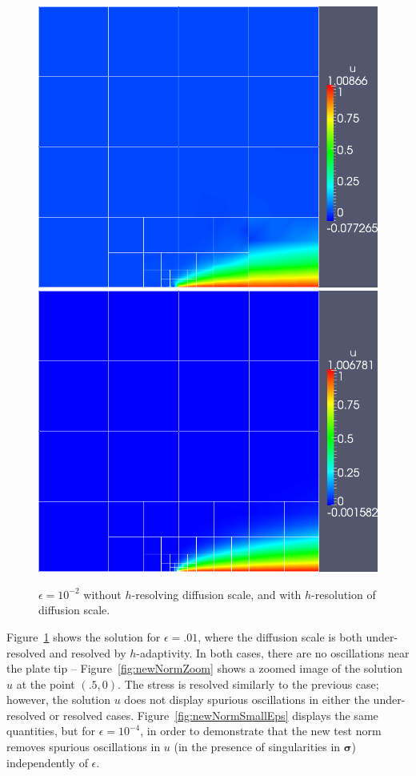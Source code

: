 \documentclass[letterpaper]{article}
\def\bfsigma{\boldsymbol\sigma}
\begin{document}
\begin{figure}[!h]
\centering
\includegraphics[scale=.275]{figs/LaplaceFigs/coupled1e2h1e2.png}
\includegraphics[scale=.275]{figs/LaplaceFigs/coupled1e2h1e3.png}
\caption{$\epsilon = 10^{-2}$ without $h$-resolving diffusion scale, and with $h$-resolution of diffusion scale.}
\label{fig:newNorm}
\end{figure}

Figure~\ref{fig:newNorm} shows the solution for $\epsilon = .01$, where the
diffusion scale is both under-resolved and resolved by $h$-adaptivity.  In both
cases, there are no oscillations near the plate tip --
Figure~\ref{fig:newNormZoom} shows a zoomed image of the solution $u$ at the
point $(.5,0)$.  The stress is resolved similarly to the previous case;
however, the solution $u$ does not display spurious oscillations in either the
under-resolved or resolved cases.  Figure~\ref{fig:newNormSmallEps} displays
the same quantities, but for $\epsilon = 10^{-4}$, in order to demonstrate
that the new test norm removes spurious oscillations in $u$ (in the presence
of singularities in $\bfsigma$) independently of $\epsilon$.
\end{document}
